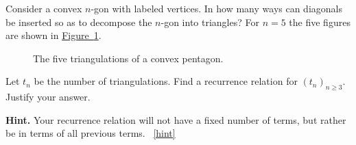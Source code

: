 \documentclass{book}
\begin{document}
\setcounter{project}{141}
\addtocounter{project}{-1}
\begin{activity}[]\label{act-catalanfirst}
\hypertarget{p-954}{}%
Consider a convex \(n\)-gon with labeled vertices.  In how many ways can diagonals be inserted so as to decompose the \(n\)-gon into triangles? For \(n = 5\) the five figures are shown in \hyperref[five5gons]{Figure~\ref{five5gons}}.%
\begin{figure}
\centering
\begin{sidebyside}{5}{0}{0}{0}
\begin{sbspanel}{0.2}
\end{sbspanel}
\begin{sbspanel}{0.2}
\end{sbspanel}
\begin{sbspanel}{0.2}
\end{sbspanel}
\begin{sbspanel}{0.2}
\end{sbspanel}
\begin{sbspanel}{0.2}
\end{sbspanel}
\end{sidebyside}
\caption{The five triangulations of a convex pentagon.\label{five5gons}}
\end{figure}
\hypertarget{p-955}{}%
Let \(t_n\) be the number of triangulations.  Find a recurrence relation for \((t_n)_{n \ge 3}\).  Justify your answer.%
\par\smallskip%
\noindent\textbf{Hint.}\hypertarget{hint-100}{}\quad%
\hypertarget{p-956}{}%
Your recurrence relation will not have a fixed number of terms, but rather be in terms of all previous terms.%
~\hfill{\tiny\hyperlink{a-141}{[hint]}\hypertarget{q-141}{}}\end{activity}
\end{document}

